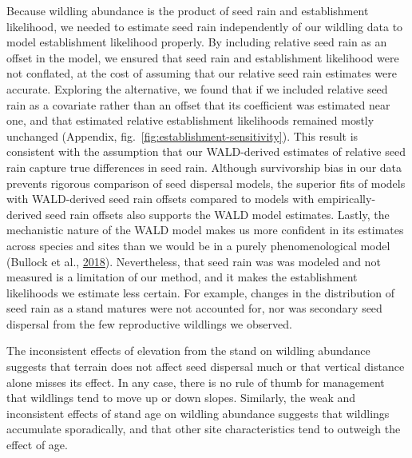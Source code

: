 \documentclass[
]{article}
\begin{document}
Because wildling abundance is the product of seed rain and establishment likelihood, we needed to estimate seed rain independently of our wildling data to model establishment likelihood properly.
By including relative seed rain as an offset in the model, we ensured that seed rain and establishment likelihood were not conflated, at the cost of assuming that our relative seed rain estimates were accurate.
Exploring the alternative, we found that if we included relative seed rain as a covariate rather than an offset that its coefficient was estimated near one, and that estimated relative establishment likelihoods remained mostly unchanged (Appendix, fig.~\ref{fig:establishment-sensitivity}).
This result is consistent with the assumption that our WALD-derived estimates of relative seed rain capture true differences in seed rain.
Although survivorship bias in our data prevents rigorous comparison of seed dispersal models, the superior fits of models with WALD-derived seed rain offsets compared to models with empirically-derived seed rain offsets also supports the WALD model estimates.
Lastly, the mechanistic nature of the WALD model makes us more confident in its estimates across species and sites than we would be in a purely phenomenological model (Bullock et al., \protect\hyperlink{ref-bullockAllDispersalFunctions2018}{2018}).
Nevertheless, that seed rain was was modeled and not measured is a limitation of our method, and it makes the establishment likelihoods we estimate less certain.
For example, changes in the distribution of seed rain as a stand matures were not accounted for, nor was secondary seed dispersal from the few reproductive wildlings we observed.

The inconsistent effects of elevation from the stand on wildling abundance suggests that terrain does not affect seed dispersal much or that vertical distance alone misses its effect.
In any case, there is no rule of thumb for management that wildlings tend to move up or down slopes.
Similarly, the weak and inconsistent effects of stand age on wildling abundance suggests that wildlings accumulate sporadically, and that other site characteristics tend to outweigh the effect of age.
\end{document}
